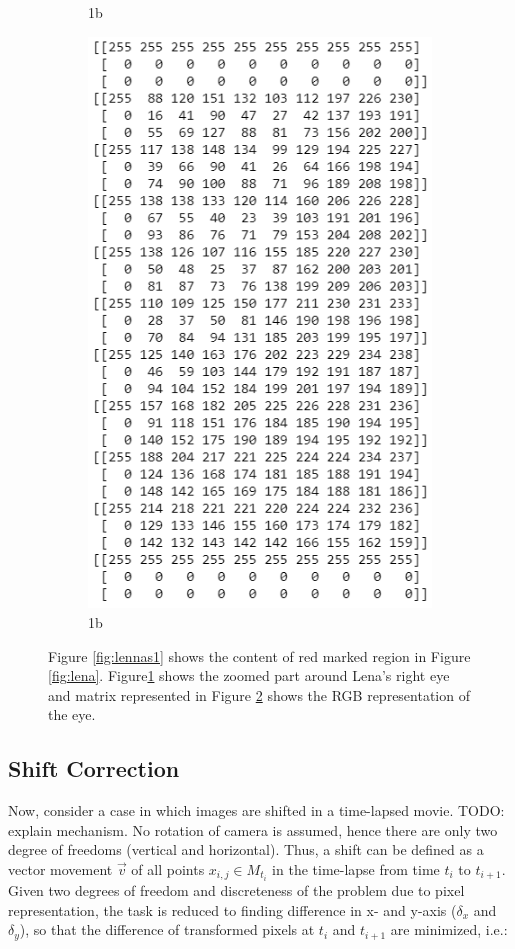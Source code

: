 \documentclass[pdftex,12pt,a4paper]{report}
\begin{document}
\begin{figure}[h]
\begin{subfigure}{.5\textwidth}
  \caption{1b}
  \label{fig:lennas2}
\end{subfigure}
\centering
\begin{subfigure}{.5\textwidth}
  \includegraphics[width=.8\linewidth]{images/lenna_rbg}
  \caption{1b}
  \label{fig:lennas3}
\end{subfigure}
\caption{Figure \ref{fig:lennas1} shows the content of red marked region in Figure \ref{fig:lena}. Figure\ref{fig:lennas2} shows the zoomed part around Lena's right eye and matrix represented in Figure \ref{fig:lennas3} shows the RGB representation of the eye.}
\label{fig:lennas}
\end{figure}


\subsection{Shift Correction}

Now, consider a case in which images are shifted in a time-lapsed movie. TODO: explain mechanism. No rotation of camera is assumed, hence there are only two degree of freedoms (vertical and horizontal). Thus, a shift can be defined as a vector movement $\vec{v}$ of all points $x_{i,j} \in M_{t_i}$ in the time-lapse from time $t_i$ to $t_{i+1}$. Given two degrees of freedom and discreteness of the problem due to pixel representation, the task is reduced to finding difference in x- and y-axis ($\delta_x$ and $\delta_y$), so that the difference of transformed pixels at $t_i$ and $t_{i+1}$ are minimized, i.e.:
\end{document}
